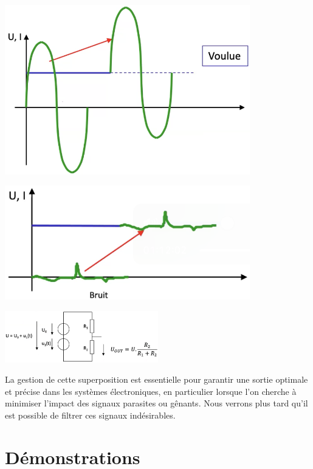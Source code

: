 \begin{minipage}[htp]{0.45\textwidth}
  \begin{center}
    \includegraphics[width=0.8\textwidth]{chapters/chapter1/images/voulue.png}
  \end{center}
\end{minipage}
\hfill  
\vline
\hfill
\begin{minipage}[htp]{0.45\textwidth}
    \includegraphics[width=0.8\textwidth]{chapters/chapter1/images/genante.png}
\end{minipage}
\begin{center}
    \includegraphics[width=0.5\textwidth]{chapters/chapter1/images/circuit.png}
\end{center}
La gestion de cette superposition est essentielle pour garantir une sortie optimale et précise dans les systèmes électroniques, en particulier lorsque l'on cherche à minimiser l'impact des signaux parasites ou gênants. Nous verrons plus tard qu'il est possible de filtrer ces signaux indésirables.

\section{Démonstrations}
